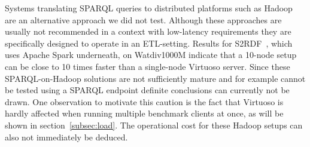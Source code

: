 Systems translating SPARQL queries to distributed platforms such as Hadoop~\cite{cure2015evaluation, graux2016multi} are an alternative approach we did not test. Although these approaches are usually not recommended in a context with low-latency requirements they are specifically designed to operate in an ETL-setting. 
Results for S2RDF~\cite{Schatzle:2016:SRQ:2977797.2977806}, which uses Apache Spark underneath, on Watdiv1000M indicate that a 10-node setup can be close to 10 times faster than a single-node Virtuoso server. Since these SPARQL-on-Hadoop solutions are not sufficiently mature and for example cannot be tested using a SPARQL endpoint definite conclusions can currently not be drawn. One observation to motivate this caution is the fact that Virtuoso is hardly affected when running multiple benchmark clients at once, as will be shown in section~\ref{subsec:load}. The operational cost for these Hadoop setups can also not immediately be deduced.